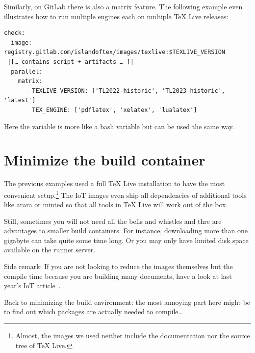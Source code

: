 \documentclass[final]{ltugboat}
\begin{document}

Similarly, on GitLab there is also a matrix feature.
The following example even illustrates how to run multiple engines each on multiple TeX Live releases:

\begin{verbatim}
check:
  image: registry.gitlab.com/islandoftex/images/texlive:$TEXLIVE_VERSION
 |[… contains script + artifacts … ]|
  parallel:
    matrix:
      - TEXLIVE_VERSION: ['TL2022-historic', 'TL2023-historic', 'latest']
        TEX_ENGINE: ['pdflatex', 'xelatex', 'lualatex']
\end{verbatim}

Here the variable is more like a bash variable but can be used the same way.


\section{Minimize the build container}
The previous examples used a full TeX Live installation to have the most convenient setup.\footnote{Almost, the images we used neither include the documentation nor the source tree of TeX Live.}
The IoT images even ship all dependencies of additional tools like arara or minted so that all tools in TeX Live will work out of the box.

Still, sometimes you will not need all the bells and whistles and thre are advantages to smaller build containers.
For instance, downloading more than one gigabyte can take quite some time long.
Or you may only have limited disk space available on the runner server.

Side remark: If you are not looking to reduce the images themselves but the compile time because you are building many documents, have a look at last year's IoT article~\cite{islandoftex-docker}.

Back to minimizing the build environment: the most annoying part here might be to find out which packages are actually needed to compile…
\end{document}
